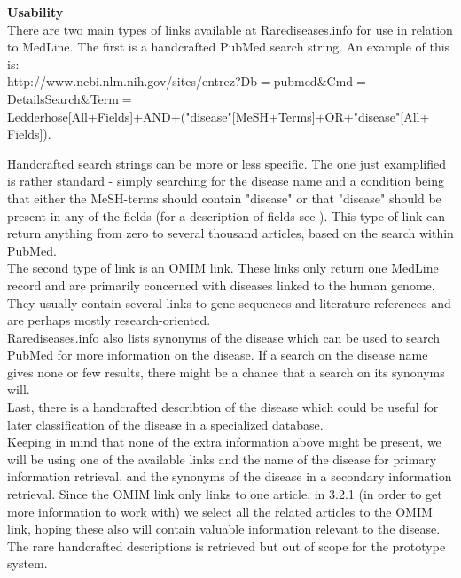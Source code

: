 \textbf{Usability} \\
There are two main types of links available at Rarediseases.info for
use in relation to MedLine. The first is a handcrafted PubMed search
string. An example of this is:\\

{\small
http://www.ncbi.nlm.nih.gov/sites/entrez?Db$=$pubmed\&Cmd$=$DetailsSearch\&Term$=$ \\
Ledderhose[All$+$Fields]$+$AND$+$("disease"[MeSH$+$Terms]$+$OR$+$"disease"[All$+$Fields]). \\
}

Handcrafted search strings can be more or less specific. The one just
examplified is rather standard - simply searching for the disease name
and a condition being that either the MeSH-terms should contain
"disease" or that "disease" should be present in any of the fields
(for a description of fields see
\cite{PubMedHelpSearchFieldDescriptionsTags}). This
type of link can return anything from zero to several thousand
articles, based on the search within PubMed.\\

The second type of link is an OMIM link. These links only return one
MedLine record and are primarily concerned with diseases linked to the
human genome. They usually contain several links to gene sequences and
literature references and are perhaps mostly research-oriented.\\

Rarediseases.info also lists synonyms of the disease which can be used
to search PubMed for more information on the disease. If a search on
the disease name gives none or few results, there might be a chance
that a search on its synonyms will.\\

Last, there is a handcrafted describtion of the disease which could be
useful for later classification of the disease in a specialized
database.\\

Keeping in mind that none of the extra information above might be
present, we will be using one of the available links and the name of
the disease for primary information retrieval, and the synonyms of the
disease in a secondary information retrieval. Since the OMIM link only
links to one article, in 3.2.1  (in order to get more
information to work with) we select all the related articles to the
OMIM link, hoping these also will contain valuable information
relevant to the disease. The rare handcrafted descriptions is
retrieved but out of scope for the prototype
system.  \\

